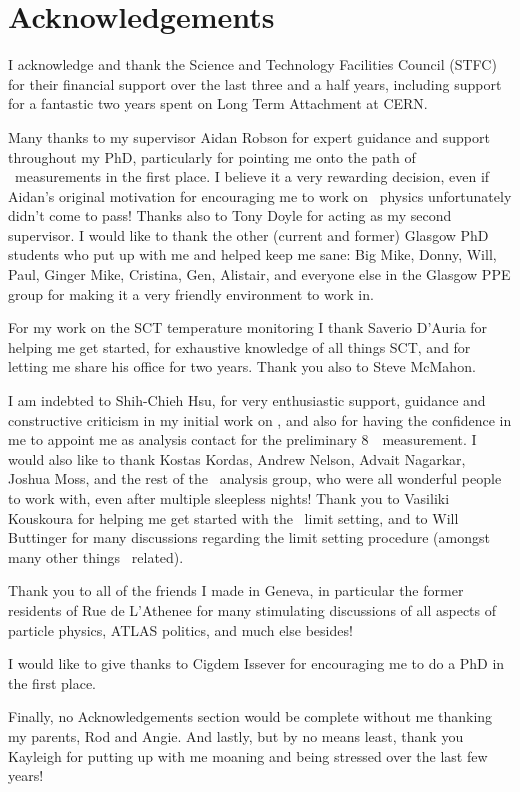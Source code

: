 \chapter*{Acknowledgements}
I acknowledge and thank the Science and Technology Facilities Council
(STFC) for their financial support over the last three and a half years,
including support for a fantastic two years spent on Long Term Attachment at CERN.

Many thanks to my supervisor Aidan Robson for expert guidance and support throughout my
PhD, particularly for pointing me onto the path of \ZZ\ measurements in the first
place. I believe it a very rewarding decision, even if Aidan's original
motivation for encouraging me to work on \ZZ\ physics unfortunately didn't come to
pass! 
Thanks also to Tony
Doyle for acting as my second supervisor.
I would like to thank the other (current and former) Glasgow PhD students who put up with me and
helped keep me sane: Big Mike, Donny, Will, Paul, Ginger Mike, Cristina, Gen,
Alistair, and everyone else in the Glasgow PPE group for making it a very
friendly environment to work in.

For my work on the SCT temperature monitoring I thank Saverio D'Auria
for helping me get started, for exhaustive knowledge of all things SCT, and for
letting me share his office for two years. Thank you also to Steve McMahon.

I am indebted to Shih-Chieh Hsu, for very enthusiastic
support, guidance and constructive criticism in my initial work on \ZZ, and
also for having the confidence in me to appoint me as analysis contact for the
preliminary 8~\tev\ measurement. I would also like to thank Kostas Kordas,
Andrew Nelson, Advait Nagarkar, Joshua Moss, and the rest of the \ZZ\ analysis
group, who were all wonderful people to work with, even after multiple sleepless
nights! Thank you to Vasiliki Kouskoura for helping me get started with the
\TGC\ limit setting, and to Will Buttinger for many discussions regarding the
limit setting procedure (amongst many other things \ZZ\ related).

Thank you to all of the friends I made in Geneva, in particular the former
residents of Rue de L'Athenee for many stimulating discussions of all aspects of
particle physics, ATLAS politics, and much else besides!

I would like to give thanks to Cigdem Issever for encouraging me to do a PhD in the first
place. 

Finally, no Acknowledgements section would be complete without me
thanking my parents, Rod and Angie. And lastly, but by no means least, thank you Kayleigh for putting up with
me moaning and being stressed over the last few years!
